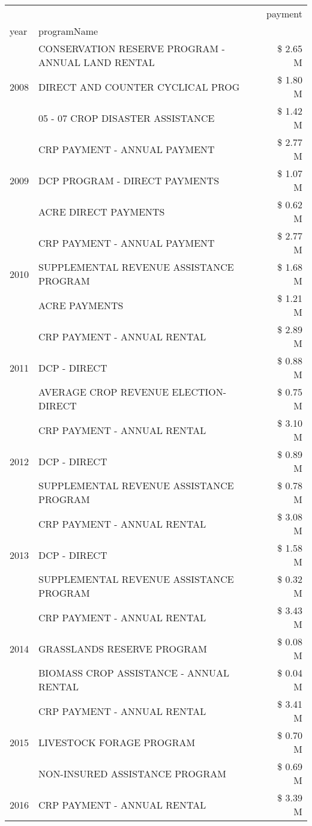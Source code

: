\begin{tabular}{llr}
\toprule
 &  & payment \\
year & programName &  \\
\midrule
\multirow[t]{3}{*}{2008} & CONSERVATION RESERVE PROGRAM - ANNUAL LAND RENTAL & \$ 2.65 M \\
 & DIRECT AND COUNTER CYCLICAL PROG & \$ 1.80 M \\
 & 05 - 07 CROP DISASTER ASSISTANCE & \$ 1.42 M \\
\cline{1-3}
\multirow[t]{3}{*}{2009} & CRP PAYMENT - ANNUAL PAYMENT & \$ 2.77 M \\
 & DCP PROGRAM - DIRECT PAYMENTS & \$ 1.07 M \\
 & ACRE DIRECT PAYMENTS & \$ 0.62 M \\
\cline{1-3}
\multirow[t]{3}{*}{2010} & CRP PAYMENT - ANNUAL PAYMENT & \$ 2.77 M \\
 & SUPPLEMENTAL REVENUE ASSISTANCE PROGRAM & \$ 1.68 M \\
 & ACRE PAYMENTS & \$ 1.21 M \\
\cline{1-3}
\multirow[t]{3}{*}{2011} & CRP PAYMENT - ANNUAL RENTAL & \$ 2.89 M \\
 & DCP - DIRECT & \$ 0.88 M \\
 & AVERAGE CROP REVENUE ELECTION-DIRECT & \$ 0.75 M \\
\cline{1-3}
\multirow[t]{3}{*}{2012} & CRP PAYMENT - ANNUAL RENTAL & \$ 3.10 M \\
 & DCP - DIRECT & \$ 0.89 M \\
 & SUPPLEMENTAL REVENUE ASSISTANCE PROGRAM & \$ 0.78 M \\
\cline{1-3}
\multirow[t]{3}{*}{2013} & CRP PAYMENT - ANNUAL RENTAL & \$ 3.08 M \\
 & DCP - DIRECT & \$ 1.58 M \\
 & SUPPLEMENTAL REVENUE ASSISTANCE PROGRAM & \$ 0.32 M \\
\cline{1-3}
\multirow[t]{3}{*}{2014} & CRP PAYMENT - ANNUAL RENTAL & \$ 3.43 M \\
 & GRASSLANDS RESERVE PROGRAM & \$ 0.08 M \\
 & BIOMASS CROP ASSISTANCE - ANNUAL RENTAL & \$ 0.04 M \\
\cline{1-3}
\multirow[t]{3}{*}{2015} & CRP PAYMENT - ANNUAL RENTAL & \$ 3.41 M \\
 & LIVESTOCK FORAGE PROGRAM & \$ 0.70 M \\
 & NON-INSURED ASSISTANCE PROGRAM & \$ 0.69 M \\
\cline{1-3}
\multirow[t]{3}{*}{2016} & CRP PAYMENT - ANNUAL RENTAL & \$ 3.39 M \\

\end{tabular}
